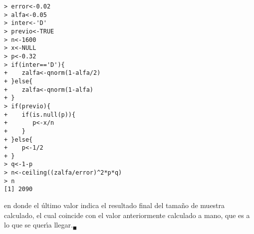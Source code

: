 \begin{solucion}
 \begin{verbatim}
> error<-0.02
> alfa<-0.05
> inter<-'D'
> previo<-TRUE
> n<-1600
> x<-NULL
> p<-0.32
> if(inter=='D'){
+    zalfa<-qnorm(1-alfa/2)
+ }else{
+    zalfa<-qnorm(1-alfa)
+ }
> if(previo){
+    if(is.null(p)){
+       p<-x/n
+    }
+ }else{
+    p<-1/2
+ }
> q<-1-p
> n<-ceiling((zalfa/error)^2*p*q)
> n
[1] 2090
 \end{verbatim}
 \vspace{-0.5cm}
 en donde el \'ultimo valor indica el resultado final del tama\~no de muestra calculado, el cual coincide con el valor anteriormente calculado a mano, que es a lo que se quer\'{\i}a llegar.${}_{\blacksquare}$
\end{solucion}
